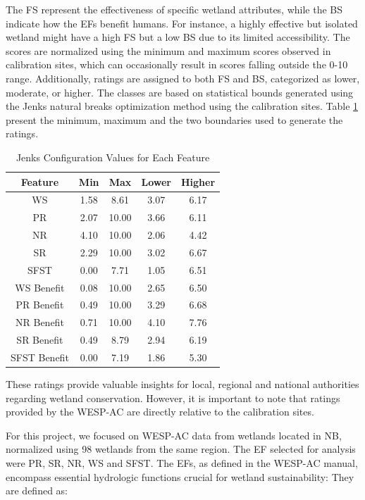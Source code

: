 \documentclass[12pt,letterpaper]{article}
\begin{document}
The \ac{FS} represent the effectiveness of specific wetland attributes, while the \ac{BS} indicate how the \ac{EF}s benefit humans.
For instance, a highly effective but isolated wetland might have a high \ac{FS} but a low \ac{BS} due to its limited accessibility.
The scores are normalized using the minimum and maximum scores observed in calibration sites, which can occasionally result in scores falling outside the 0-10 range.
Additionally, ratings are assigned to both \ac{FS} and \ac{BS}, categorized as lower, moderate, or higher.
The classes are based on statistical bounds generated using the Jenks natural breaks optimization method using the calibration sites.
Table \ref{config_values_table} present the minimum, maximum and the two boundaries used to generate the ratings.
\begin{table}[H]
\centering
\begin{tabular}{|c|c|c|c|c|}
\hline
\textbf{Feature} & \textbf{Min} & \textbf{Max} & \textbf{Lower} & \textbf{Higher} \\
\hline
WS & 1.58 & 8.61 & 3.07 & 6.17 \\
\hline
PR & 2.07 & 10.00 & 3.66 & 6.11 \\
\hline
NR & 4.10 & 10.00 & 2.06 & 4.42 \\
\hline
SR & 2.29 & 10.00 & 3.02 & 6.67 \\
\hline
SFST & 0.00 & 7.71 & 1.05 & 6.51 \\
\hline
WS Benefit & 0.08 & 10.00 & 2.65 & 6.50 \\
\hline
PR Benefit & 0.49 & 10.00 & 3.29 & 6.68 \\
\hline
NR Benefit & 0.71 & 10.00 & 4.10 & 7.76 \\
\hline
SR Benefit & 0.49 & 8.79 & 2.94 & 6.19 \\
\hline
SFST Benefit & 0.00 & 7.19 & 1.86 & 5.30 \\
\hline
\end{tabular}
\caption{Jenks Configuration Values for Each Feature}
\label{config_values_table}
\end{table}

These ratings provide valuable insights for local, regional and national authorities regarding wetland conservation.
However, it is important to note that ratings provided by the \ac{WESP-AC} are directly relative to the calibration sites.

For this project, we focused on \ac{WESP-AC} data from wetlands located in \ac{NB}, normalized using 98 wetlands from the same region.
The \ac{EF} selected for analysis were \ac{PR}, \ac{SR}, \ac{NR}, \ac{WS} and \ac{SFST}.
The \ac{EF}s, as defined in the \ac{WESP-AC} manual, encompass essential hydrologic functions crucial for wetland sustainability:
They are defined as:
\end{document}

